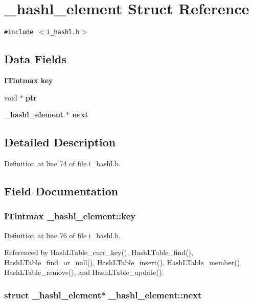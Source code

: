 \section{\_\-hashl\_\-element Struct Reference}
\label{struct__hashl__element}
{\tt \#include $<$i\_\-hashl.h$>$}

\subsection*{Data Fields}
\begin{CompactItemize}
\item 
\bf{ITintmax} \bf{key}
\item 
void $\ast$ \bf{ptr}
\item 
\bf{\_\-hashl\_\-element} $\ast$ \bf{next}
\end{CompactItemize}


\subsection{Detailed Description}




Definition at line 74 of file i\_\-hashl.h.

\subsection{Field Documentation}
\subsubsection{\setlength{\rightskip}{0pt plus 5cm}\bf{ITintmax} \bf{\_\-hashl\_\-element::key}}\label{struct__hashl__element_26d48001071389495d3f6c0bf8fe20df}




Definition at line 76 of file i\_\-hashl.h.

Referenced by Hash\-LTable\_\-curr\_\-key(), Hash\-LTable\_\-find(), Hash\-LTable\_\-find\_\-or\_\-null(), Hash\-LTable\_\-insert(), Hash\-LTable\_\-member(), Hash\-LTable\_\-remove(), and Hash\-LTable\_\-update().
\subsubsection{\setlength{\rightskip}{0pt plus 5cm}struct \bf{\_\-hashl\_\-element}$\ast$ \bf{\_\-hashl\_\-element::next}}\label{struct__hashl__element_bcf1f693fc331c954c24433cb4fc6c1b}




